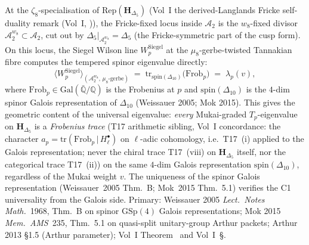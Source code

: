 \begin{remark}
\label{rem:gl-kazhdan-genus2-siegel-wilson}
At the $\zeta_8$-specialisation of $\mathrm{Rep}(\mathbf{H}_{\Delta_5})$
(Vol~I the derived-Langlands Fricke self-duality remark (Vol~I, \cite{VolI})), the
Fricke-fixed locus inside $\mathcal{A}_2$ is the $w_8$-fixed divisor
$\mathcal{A}_2^{w_8}\subset\mathcal{A}_2$, cut out by
$\Delta_5|_{\mathcal{A}_2^{w_8}} = \Delta_5$ (the Fricke-symmetric part
of the cusp form). On this locus, the Siegel Wilson line
$W_p^{\mathrm{Siegel}}$ at the $\mu_8$-gerbe-twisted Tannakian fibre
computes the tempered spinor eigenvalue directly:
\begin{equation}
\label{eq:gl-kazhdan-siegel-wilson-trace}
 \bigl\langle
 W_p^{\mathrm{Siegel}}
 \bigr\rangle_{(\mathcal{A}_2^{w_8},\,\mu_8\text{-gerbe})}
 \;=\;
 \mathrm{tr}_{\mathrm{spin}(\Delta_{10})}\bigl(
 \mathrm{Frob}_p
 \bigr)
 \;=\;
 \lambda_p(v),
\end{equation}
where $\mathrm{Frob}_p\in\mathrm{Gal}(\bar{\mathbb{Q}}/\mathbb{Q})$ is
the Frobenius at $p$ and $\mathrm{spin}(\Delta_{10})$ is the $4$-dim
spinor Galois representation of $\Delta_{10}$ (Weissauer 2005;
Mok 2015). This gives the geometric content of the universal
eigenvalue: \emph{every} Mukai-graded $T_p$-eigenvalue on
$\mathbf{H}_{\Delta_5}$ is a \emph{Frobenius trace}
(T17 arithmetic sibling, Vol~I concordance: the character
$a_p = \mathrm{tr}(\mathrm{Frob}_p\,|\,H^\bullet_\ell)$ on
$\ell$-adic cohomology, i.e.\ T17~(i) applied to the Galois
representation; never the chiral trace T17~(viii) on
$\mathbf{H}_{\Delta_5}$ itself, nor the categorical trace
T17~(ii)) on the same $4$-dim
Galois representation $\mathrm{spin}(\Delta_{10})$, regardless of the
Mukai weight $v$. The uniqueness of the spinor Galois representation
(Weissauer~2005 Thm.~B; Mok~2015 Thm.~5.1) verifies the C1 universality
from the Galois side. Primary: Weissauer 2005 \emph{Lect.~Notes
Math.}~1968, Thm.~B on spinor $\mathrm{GSp}(4)$ Galois representations;
Mok 2015 \emph{Mem.~AMS}~235, Thm.~5.1 on quasi-split unitary-group
Arthur packets; Arthur 2013 \S 1.5 (Arthur parameter); Vol~I
Theorem~\cite{VolI} and
Vol~I~\S\cite{VolI}.
\end{remark}

